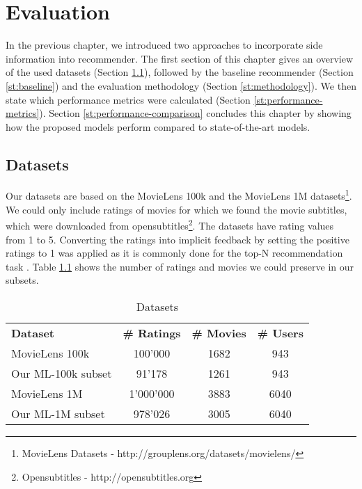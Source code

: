 \chapter{Evaluation}
\label{c:evaluation}

In the previous chapter, we introduced two approaches to incorporate side information into recommender.
The first section of this chapter gives an overview of the used datasets (Section \ref{st:datasets}), followed by the baseline recommender (Section \ref{st:baseline}) and the evaluation methodology (Section \ref{st:methodology}).
We then state which performance metrics were calculated (Section \ref{st:performance-metrics}).
Section \ref{st:performance-comparison} concludes this chapter by showing how the proposed models perform compared to state-of-the-art models.


\section{Datasets}
\label{st:datasets}
Our datasets are based on the MovieLens 100k and the MovieLens 1M datasets\footnote{MovieLens Datasets - http://grouplens.org/datasets/movielens/}.
We could only include ratings of movies for which we found the movie subtitles, which were downloaded from opensubtitles\footnote{Opensubtitles - http://opensubtitles.org}.
The datasets have rating values from 1 to 5.
Converting the ratings into implicit feedback by setting the positive ratings to 1 was applied as it is commonly done for the top-N recommendation task \cite{Kabbur2015}.
Table \ref{tab:datasets} shows the number of ratings and movies we could preserve in our subsets.


\begin{table}[h]
	\begin{center}
		\begin{tabularx}{0.9\linewidth}{Xccc}
			\hline \hline
			\textbf{Dataset} & \textbf{\# Ratings} & \textbf{\# Movies} & \textbf{\# Users} \\
			MovieLens 100k & 100'000 & 1682 & 943 \\
			Our ML-100k subset & 91'178 & 1261 & 943 \\
			MovieLens 1M & 1'000'000 & 3883 & 6040 \\
			Our ML-1M subset & 978'026 & 3005 & 6040 \\
			\hline \hline
		\end{tabularx}
	\end{center}
	\caption{Datasets}
	\label{tab:datasets}
\end{table}


